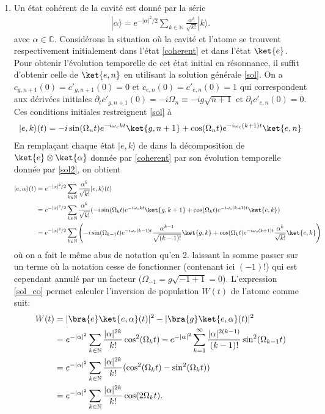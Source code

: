 {\begin{enumerate}
    \item Un état cohérent de la cavité est donné par la série 
    \begin{align} 
        |\alpha\rangle=e^{-|\alpha|^2 / 2} \sum_{k \in \mathbb{N}} \frac{\alpha^k}{\sqrt{k !}}|k\rangle. \label{coherent}
    \end{align}
    avec $\alpha \in \mathbb{C}$.
    Considérons la situation où la cavité et l'atome se trouvent respectivement initialement dans l'état \eqref{coherent} et dans l'état $\ket{e}$. Pour obtenir l'évolution temporelle de cet état initial en résonnance, il suffit d'obtenir celle de $\ket{e, n}$ en utilisant la solution générale \eqref{sol}. On a $c_{g, n+1}(0) = c'_{g, n+1}(0) = 0$ et $c_{e, n}(0) = c'_{e, n}(0) = 1$ qui correspondent aux dérivées initiales $\partial_t c'_{g, n+1}(0) = -i\Omega_n \equiv -ig\sqrt{n+1}$ et $\partial_t c'_{e, n}(0) = 0$. Ces conditions initiales restreignent \eqref{sol} à 
    \begin{align} 
        |e, k\rangle(t) = -i\sin(\Omega_n t)e^{-i\omega_c k t}\ket{g, n+1} + \cos(\Omega_n t)e^{-i\omega_c (k+1) t}\ket{e, n} \label{sol2}
    \end{align}
    En remplaçant chaque état $|e, k\rangle$ de dans la décomposition de $\ket{e}\otimes \ket{\alpha}$ donnée par \eqref{coherent} par son évolution temporelle donnée par \eqref{sol2}, on obtient 
    \begin{align}
        |e, \alpha\rangle(t) &= e^{-|\alpha|^2 / 2} \sum_{k \in \mathbb{N}} \frac{\alpha^k}{\sqrt{k !}}|e, k\rangle(t) \nonumber\\ &= e^{-|\alpha|^2 / 2} \sum_{k \in \mathbb{N}} \frac{\alpha^k}{\sqrt{k !}}(-i\sin(\Omega_k t)e^{-i\omega_c k t}\ket{g, k+1} + \cos(\Omega_k t)e^{-i\omega_c (k+1) t}\ket{e, k}) \nonumber \\
        &= e^{-|\alpha|^2 / 2} \sum_{k \in \mathbb{N}} \left(-i\sin(\Omega_{k-1} t)e^{-i\omega_c (k-1) t}\frac{\alpha^{k-1}}{\sqrt{(k-1)!}}\ket{g, k} + \cos(\Omega_k t)e^{-i\omega_c (k+1) t}\frac{\alpha^k}{\sqrt{k !}}\ket{e, k}\right) \label{sol_co}
    \end{align}
    où on a fait le même abus de notation qu'en 2. laissant la somme passer sur un terme où la notation cesse de fonctionner (contenant ici $(-1)!$) qui est cependant annulé par un facteur ($\Omega_{-1} = g\sqrt{-1+1} = 0$).
    L'expression \eqref{sol_co} permet calculer l'inversion de population $W(t)$ de l'atome comme suit:
    \begin{align}
      W(t) &= |\bra{e} \ket{e, \alpha}(t)|^2 - |\bra{g} \ket{e, \alpha}(t)|^2\nonumber \\
      &= e^{-|\alpha|^2} \sum_{k \in \mathbb{N}} \frac{|\alpha|^{2k}}{k !}\cos^2(\Omega_{k} t)  - e^{-|\alpha|^2} \sum_{k=1}^{\infty} \frac{|\alpha|^{2(k-1)}}{(k-1)!}\sin^2(\Omega_{k-1} t) \nonumber\\
      &= e^{-|\alpha|^2} \sum_{k \in \mathbb{N}} \frac{|\alpha|^{2k}}{k !}(\cos^2(\Omega_{k} t)   - \sin^2(\Omega_{k} t))\nonumber\\
      &= e^{-|\alpha|^2} \sum_{k \in \mathbb{N}} \frac{|\alpha|^{2k}}{k !}\cos(2\Omega_{k} t).\label{popinv}
    \end{align}
    

\end{enumerate}}

